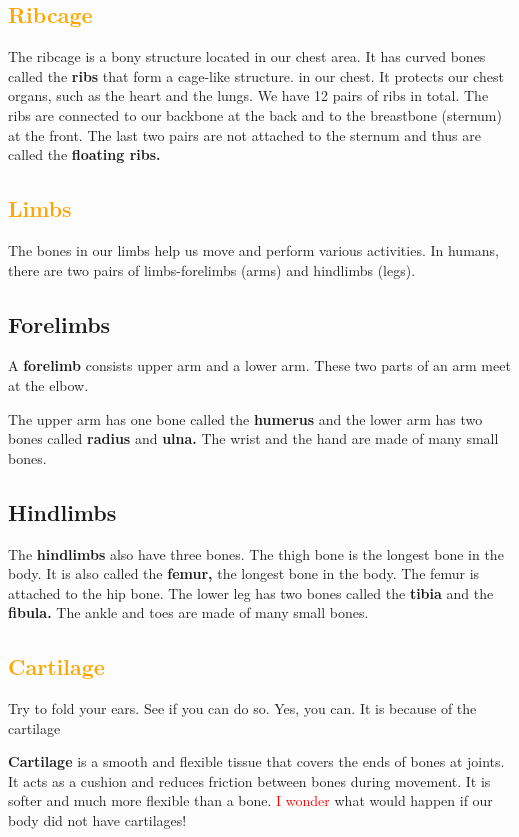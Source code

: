 \subsection{\textcolor{orange}{Ribcage}}
The ribcage is a bony structure located in our chest area. It has curved bones called the \textbf{ribs} that form a cage-like structure. in our chest. It protects our chest organs, such as the heart and the lungs. We have 12 pairs of ribs in total. The ribs are connected to our backbone at the back and to the breastbone (sternum) at the front. The last two pairs are not attached to the sternum and thus are called the \textbf{floating ribs.}
\subsection{\textcolor{orange}{Limbs}}
The bones in our limbs help us move and perform various activities. In humans, there are two pairs of limbs-forelimbs (arms) and hindlimbs (legs).
\subsection{\textbf{Forelimbs}}
A \textbf{forelimb} consists upper arm and a lower arm. These two parts of an arm meet at the elbow.
\vspace{0.1in}
\par
The upper arm has one bone called the \textbf{humerus} and the lower arm has two bones called \textbf{radius} and \textbf{ulna.} The wrist and the hand are made of many small bones.
\vspace{0.9in}
\subsection{\textbf{Hindlimbs}}
The \textbf{hindlimbs} also have three bones. The thigh bone is the longest bone in the body. It is also called the \textbf{femur,} the longest bone in the body. The femur is attached to the hip bone. The lower leg has two bones called the \textbf{tibia} and the \textbf{fibula.} The ankle and toes are made of many small bones.
\subsection{\textcolor{orange}{Cartilage}}
Try to fold your ears. See if you can do so. Yes, you can. It is because of the cartilage
\vspace{0.1in}
\par
\textbf{Cartilage} is a smooth and flexible tissue that covers the ends of bones at joints. It acts as a cushion and reduces friction between bones during movement. It is softer and much more flexible than a bone.
\vspace{0.3in}
\textcolor{red}{I wonder} what would happen if our body did not have cartilages!
\vspace{3.1in}
